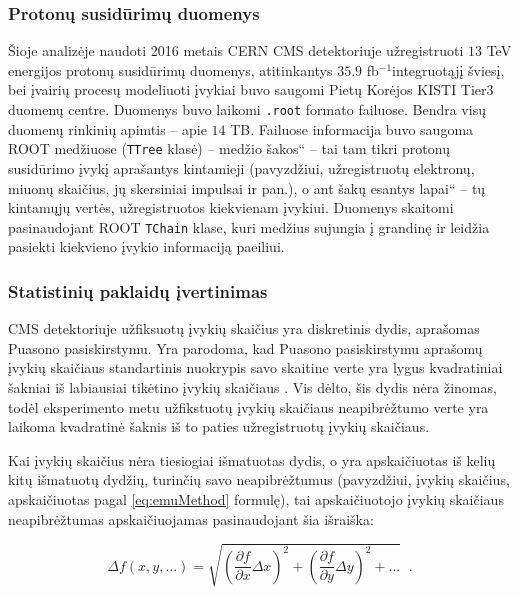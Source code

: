 \documentclass[a4paper, 12pt]{article}
\newcommand{\ttt}[1]{\texttt{#1}}
\newcommand{\ltq}[1]{{\quotedblbase{}#1\textquotedblleft{}}}
\newcommand{\invfb}{fb$^{-1}$}
\newlength\q
\begin{document}
\subsubsection{Protonų susidūrimų duomenys}\label{sec:data}

Šioje analizėje naudoti 2016 metais CERN CMS detektoriuje užregistruoti $13$ TeV energijos protonų susidūrimų duomenys,
atitinkantys $35.9$ \invfb integruotąjį šviesį, bei įvairių procesų modeliuoti įvykiai buvo saugomi Pietų Korėjos KISTI
Tier3 duomenų centre.
Duomenys buvo laikomi \ttt{.root} formato failuose.
Bendra visų duomenų rinkinių apimtis -- apie $14$ TB.
Failuose informacija buvo saugoma ROOT medžiuose (\ttt{TTree} klasė) -- medžio \ltq{šakos} -- tai tam tikri protonų
susidūrimo įvykį aprašantys kintamieji (pavyzdžiui, užregistruotų elektronų, miuonų skaičius, jų skersiniai impulsai ir pan.),
o ant šakų esantys \ltq{lapai} -- tų kintamųjų vertės, užregistruotos kiekvienam įvykiui.
Duomenys skaitomi pasinaudojant ROOT \ttt{TChain} klase, kuri medžius sujungia į grandinę ir leidžia pasiekti kiekvieno įvykio
informaciją paeiliui.

\subsubsection{Statistinių paklaidų įvertinimas}\label{sec:uncertainties}

CMS detektoriuje užfiksuotų įvykių skaičius yra diskretinis dydis, aprašomas Puasono pasiskirstymu.
Yra parodoma, kad Puasono pasiskirstymu aprašomų įvykių skaičiaus standartinis nuokrypis savo skaitine verte yra lygus
kvadratiniai šakniai iš labiausiai tikėtino įvykių skaičiaus \cite{Poisson}.
Vis dėlto, šis dydis nėra žinomas, todėl eksperimento metu užfikstuotų įvykių skaičiaus neapibrėžtumo verte yra laikoma
kvadratinė šaknis iš to paties užregistruotų įvykių skaičiaus.

Kai įvykių skaičius nėra tiesiogiai išmatuotas dydis, o yra apskaičiuotas iš kelių kitų išmatuotų dydžių, turinčių savo
neapibrėžtumus (pavyzdžiui, įvykių skaičius, apskaičiuotas pagal \eqref{eq:emuMethod} formulę), tai apskaičiuotojo įvykių
skaičiaus neapibrėžtumas apskaičiuojamas pasinaudojant šia išraiška:

\begin{equation}
	\Delta f(x, y, ...) =
	\sqrt{ \left( \frac{\partial f}{\partial x} \Delta x \right)^{2} +
	\left( \frac{\partial f}{\partial y} \Delta y \right)^{2} + ... } \;\; \mathrm{.}
	\label{eq:DerUnc}
\end{equation}
\end{document}
